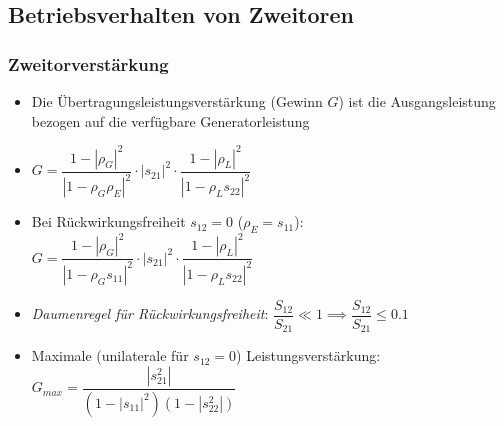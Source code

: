 {\subsection{Betriebsverhalten von Zweitoren}
\subsubsection{Zweitorverstärkung}
\begin{itemize}
    \itemsep3pt
    \item Die Übertragungsleistungsverstärkung (Gewinn $G$) ist die Ausgangsleistung bezogen auf die verfügbare Generatorleistung
    \item \(G = \dfrac{1 - |\rho_G|^2}{|1 - \rho_G \rho_E|^2} \cdot |s_{21}|^2 \cdot \dfrac{1 - |\rho_L|^2}{|1 - \rho_{L}s_{22}|^2}\)
    \item Bei Rückwirkungsfreiheit $s_{12} = 0$ ($\rho_E = s_{11}$):\\
        \(G = \dfrac{1 - |\rho_G|^2}{|1 - \rho_G s_{11}|^2} \cdot |s_{21}|^2 \cdot \dfrac{1 - |\rho_L|^2}{|1 - \rho_{L}s_{22}|^2}\)
    \item \textit{Daumenregel für Rückwirkungsfreiheit}: \(\dfrac{S_{12}}{S_{21}} \ll 1 \implies \dfrac{S_{12}}{S_{21}} \leq 0.1\)
    \item Maximale (unilaterale für $s_{12} = 0$) Leistungsverstärkung:\\
        \(G_{max} = \dfrac{|s_{21}^2|}{(1 - |s_{11}|^2) (1 - |s_{22}^2|)}\)
\end{itemize}
}
